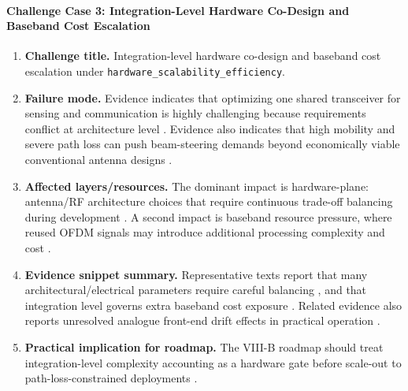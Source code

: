 \paragraph{Challenge Case 3: Integration-Level Hardware Co-Design and Baseband Cost Escalation}
\begin{enumerate}
    \item \textbf{Challenge title.} Integration-level hardware co-design and baseband cost escalation under \texttt{hardware\_scalability\_efficiency}.
    \item \textbf{Failure mode.} Evidence indicates that optimizing one shared transceiver for sensing and communication is highly challenging because requirements conflict at architecture level \cite{O_ISAC_161}. Evidence also indicates that high mobility and severe path loss can push beam-steering demands beyond economically viable conventional antenna designs \cite{O_ISAC_142}.
    \item \textbf{Affected layers/resources.} The dominant impact is hardware-plane: antenna/RF architecture choices that require continuous trade-off balancing during development \cite{O_ISAC_161}. A second impact is baseband resource pressure, where reused OFDM signals may introduce additional processing complexity and cost \cite{O_ISAC_162}.
    \item \textbf{Evidence snippet summary.} Representative texts report that many architectural/electrical parameters require careful balancing \cite{O_ISAC_161}, and that integration level governs extra baseband cost exposure \cite{O_ISAC_162}. Related evidence also reports unresolved analogue front-end drift effects in practical operation \cite{O_ISAC_162}.
    \item \textbf{Practical implication for roadmap.} The VIII-B roadmap should treat integration-level complexity accounting as a hardware gate before scale-out to path-loss-constrained deployments \cite{O_ISAC_161, O_ISAC_142, O_ISAC_162}.
\end{enumerate}

